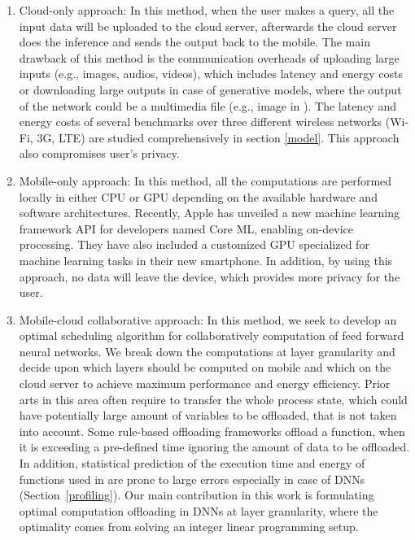 \documentclass[conference,9pt]{IEEEtran}
\begin{document}
\begin{enumerate}
\item 
Cloud-only approach: In this method, when the user makes a query, all the input data will be uploaded to the cloud server, afterwards the cloud server does the inference and sends the output back to the mobile. The main drawback of this method is the communication overheads of uploading large inputs (e.g., images, audios, videos), which includes latency and energy costs or downloading large outputs in case of generative models, where the output of the network could be a multimedia file (e.g., image in \cite{b9}). The latency and energy costs of several benchmarks over three different wireless networks (Wi-Fi, 3G, LTE) are studied comprehensively in section \eqref{model}. This approach also compromises user's privacy.
\item 
Mobile-only approach: In this method, all the computations are performed locally in either CPU or GPU depending on the available hardware and software architectures. Recently, Apple has unveiled a new machine learning framework API for developers named Core ML, enabling on-device processing\cite{b10}. They have also included a customized GPU specialized for machine learning tasks in their new smartphone\cite{b28}. In addition, by using this approach, no data will leave the device, which provides more privacy for the user.

\item 
Mobile-cloud collaborative approach: In this method, we seek to develop an optimal scheduling algorithm for collaboratively computation of feed forward neural networks. We break down the computations at layer granularity and decide upon which layers should be computed on mobile and which on the cloud server to achieve maximum performance and energy efficiency. Prior arts in this area often require to transfer the whole process state, which could have potentially large amount of variables to be offloaded, that is not taken into account\cite{b31}. Some rule-based offloading frameworks offload a function, when it is exceeding a pre-defined time ignoring the amount of data to be offloaded\cite{b33}\cite{b32}. In addition, statistical prediction of the execution time and energy of functions used in \cite{b30} are prone to large errors especially in case of DNNs (Section~\ref{profiling}). Our main contribution in this work is formulating optimal computation offloading in DNNs at layer granularity, where the optimality comes from solving an integer linear programming setup.
\end{enumerate}
\end{document}
